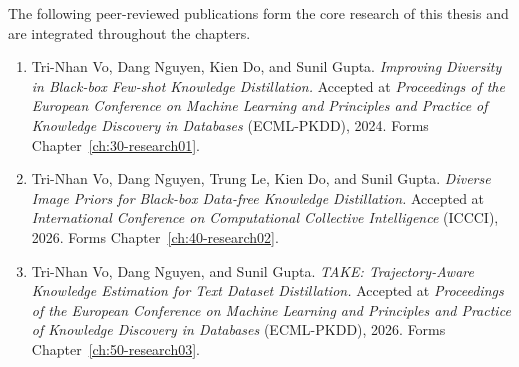 
The following peer-reviewed publications form the core research of this thesis and are integrated throughout the chapters.

\begin{enumerate}
  \item {
      Tri-Nhan Vo, Dang Nguyen, Kien Do, and Sunil Gupta.
      \textit{Improving Diversity in Black-box Few-shot Knowledge Distillation.}
      Accepted at \textit{Proceedings of the European Conference on Machine Learning and Principles and Practice of Knowledge Discovery in Databases} (ECML-PKDD), 2024.
      Forms Chapter~\ref{ch:30-research01}.
    }
  \item {
      Tri-Nhan Vo, Dang Nguyen, Trung Le, Kien Do, and Sunil Gupta.
      \textit{Diverse Image Priors for Black-box Data-free Knowledge Distillation.}
      Accepted at \textit{International Conference on Computational Collective Intelligence} (ICCCI), 2026.
      Forms Chapter~\ref{ch:40-research02}.
    }
  \item {
      Tri-Nhan Vo, Dang Nguyen, and Sunil Gupta.
      \textit{TAKE: Trajectory-Aware Knowledge Estimation for Text Dataset Distillation.}
      Accepted at \textit{Proceedings of the European Conference on Machine Learning and Principles and Practice of Knowledge Discovery in Databases} (ECML-PKDD), 2026.
      Forms Chapter~\ref{ch:50-research03}.
    }
\end{enumerate}

\newpage
